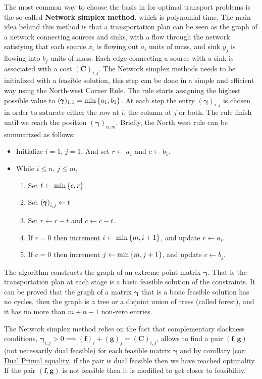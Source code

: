 The most common way to choose the basis in for optimal transport problems is the so called \textbf{Network simplex method}, which is polynomial time. The main idea behind this method is that a transportation plan can be seen as the graph of a network connecting sources and sinks, with a flow through the network satisfying that each source $x_i$ is flowing out $a_i$ units of mass, and sink $y_j$ is flowing into $b_j$ units of mass. Each edge connecting a source with a sink is associated with a cost $(\mathbf{C})_{i,j}$. 
The Network simplex methods needs to be initialized with a feasible solution, this step can be done in a simple and efficient way using the North-west Corner Rule. The rule starts assigning the highest possible value to  $(\pmb{\gamma})_{1,1}=\min\left\lbrace a_1, b_1 \right\rbrace$. At each step the entry $(\pmb{\gamma})_{i,j}$ is chosen in order to saturate either the row at $i$, the column at $j$ or both. The rule finish until we reach the position $(\pmb{\gamma})_{n,m}$. Briefly, the North west rule can be summarized as follows:
\begin{itemize}
	\item Initialize $i=1$, $j=1$. And set $r\leftarrow a_1$ and $c\leftarrow b_1$.
	\item While $i\leq n$, $j\leq m$,
	\begin{enumerate}
		\item Set $t\leftarrow \min\left\lbrace c, r \right\rbrace$.
		\item Set $\left( \pmb{\gamma} \right)_{i,j}\leftarrow t$
		\item Set $r\leftarrow r-t$ and $c\leftarrow c-t$. 
		\item If $r=0$ then increment $i\leftarrow \min \left\lbrace m,i+1 \right\rbrace$, and update $r\leftarrow a_i$.
		\item If $c=0$ then increment $j\leftarrow \min \left\lbrace m,j+1 \right\rbrace$, and update
		$c\leftarrow b_j$.
	\end{enumerate} 
\end{itemize}


The algorithm constructs the graph of an extreme point matrix $\pmb{\gamma}$. That is the transportation plan at each stage is a basic feasible solution of the constraints. It can be proved that the graph of a matrix $\pmb{\gamma}$ that is a basic feasible solution has no cycles, then the graph is a tree or a disjoint union of trees (called forest), and it has no more than $m+n-1$ non-zero entries. 

The Network simplex method relies on the fact that complementary slackness conditions, $\pmb{\gamma}_{i,j}>0\implies(\mathbf{f})_i+(\mathbf{g})_j=(\mathbf{C})_{i,j}$, allows to find a pair $(\mathbf{f},\mathbf{g})$ (not necessarily dual feasible) for each feasible matrix $\pmb{\gamma}$ and by corollary \ref{cor: Dual Primal equality} if the pair is dual feasible then we have reached optimality. If the pair $(\mathbf{f}, \mathbf{g})$ is not feasible then it is modified to get closer to feasibility. 

